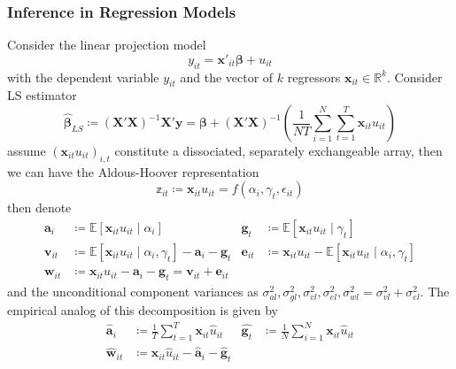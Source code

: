 \documentclass[twoside]{article}
\begin{document}
\subsubsection{Inference in Regression Models}
Consider the linear projection model
\begin{equation}\label{eq:menzel_linearmodel}
    y_{it} = \mathbf{x}'_{it}\boldsymbol{\beta} + u_{it}
\end{equation}
with the dependent variable $y_{it}$ and the vector of $k$ regressors $\mathbf{x}_{it}\in \mathbb{R}^k$. Consider LS estimator 
\begin{equation*}
    \hat{\boldsymbol{\beta}}_{LS} \coloneq \left(\mathbf{X'X}\right)^{-1}\mathbf{X'y} = \boldsymbol{\beta} + \left(\mathbf{X'X}\right)^{-1}\left(\frac{1}{NT}\sum^N_{i=1}\sum^T_{t=1}\mathbf{x}_{it}u_{it}\right)
\end{equation*}
assume $\left(\mathbf{x}_{it}u_{it}\right)_{i,t}$ constitute a dissociated, separately exchangeable array, then we can have the Aldous-Hoover representation 
\begin{equation*}
    \mathbb{z}_{it} \coloneq \mathbf{x}_{it}u_{it} = f\left(\alpha_i,\gamma_t,\epsilon_{it}\right)
\end{equation*}
then denote
\begin{align*}
    \mathbf{a}_i & \coloneq \mathbb{E}\left[\mathbf{x}_{it}u_{it}\mid\alpha_i \right] & \mathbf{g}_t & \coloneq \mathbb{E}\left[\mathbf{x}_{it}u_{it}\mid\gamma_t\right] \\
    \mathbf{v}_{it} &\coloneq \mathbb{E}\left[\mathbf{x}_{it}u_{it}\mid\alpha_i,\gamma_t\right] - \mathbf{a}_i - \mathbf{g}_t & \mathbf{e}_{it} &\coloneq \mathbf{x}_{it}u_{it} - \mathbb{E}\left[\mathbf{x}_{it}u_{it}\mid \alpha_i,\gamma_t\right] \\
    \mathbf{w}_{it} & \coloneq \mathbf{x}_{it}u_{it} - \mathbf{a}_i -\mathbf{g}_t = \mathbf{v}_{it} + \mathbf{e}_{it}
\end{align*}
and the unconditional component variances as $\sigma^2_{al},\sigma^2_{gl},\sigma^2_{vl},\sigma^2_{el},\sigma^2_{wl}=\sigma^2_{vl} + \sigma^2_{el}$. The empirical analog of this decomposition is given by 
\begin{align*}
    \hat{\mathbf{a}}_i & \coloneq \frac{1}{T}\sum^T_{t=1}\mathbf{x}_{it}\hat{u}_{it} & \hat{\mathbf{g}_{t}} &\coloneq \frac{1}{N}\sum^N_{i=1}\mathbf{x}_{it}\hat{u}_{it} \\
    \hat{\mathbf{w}}_{it} & \coloneq \mathbf{x}_{it}\hat{u}_{it} - \hat{\mathbf{a}}_i -\hat{\mathbf{g}}_t
\end{align*}
\end{document}
